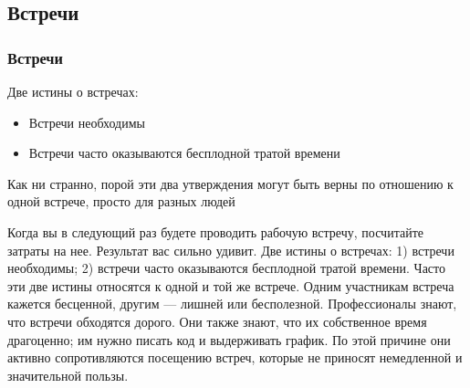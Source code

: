 \documentclass{../industrial-development}
\begin{document}
\subsection{Встречи}
\begin{frame} \frametitle{Встречи}
Две истины о встречах:
\begin{itemize}
  \item Встречи необходимы
  \item Встречи часто оказываются бесплодной тратой времени
\end{itemize}
Как ни странно, порой эти два утверждения могут быть верны по отношению к одной встрече, просто для разных людей
\end{frame}
\lecturenotes
Когда вы в следующий раз будете проводить рабочую встречу, посчитайте затраты на нее. Результат вас сильно удивит.
Две истины о встречах:
1) встречи необходимы;
2) встречи часто оказываются бесплодной тратой времени.
Часто эти две истины относятся к одной и той же встрече. Одним участникам встреча кажется бесценной, другим — лишней или бесполезной. Профессионалы знают, что встречи обходятся дорого. Они также знают, что их собственное время драгоценно; им нужно писать код и выдерживать график. По этой причине они активно сопротивляются посещению встреч, которые не приносят немедленной и значительной пользы.
\end{document}
